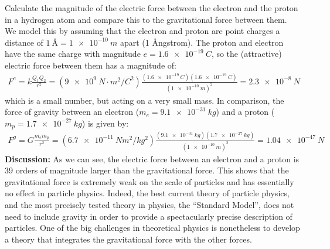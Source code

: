 \begin{example}{Calculate the magnitude of the electric force between the electron and the proton in a hydrogen atom and compare this to the gravitational force between them.}
We model this by assuming that the electron and proton are point charges a distance of $\SI{1}{\angstrom}=\SI{1e-10}{m}$ apart (1 \r Angstrom). The proton and electron have the same charge with magnitude $e=\SI{1.6e-19}{C}$, so the (attractive) electric force between them has a magnitude of:
\begin{align*}
F^e = k\frac{Q_1Q_2}{r^2}=(\SI{9e9}{N\cdot m^2/C^{2}})\frac{(\SI{1.6e-19}{C})(\SI{1.6e-19}{C})}{(\SI{1e-10}{m})^2}=\SI{2.3e-8}{N}
\end{align*}
which is a small number, but acting on a very small mass. In comparison, the force of gravity between an electron ($m_e=\SI{9.1e-31}{kg}$) and a proton ($m_p=\SI{1.7e-27}{kg}$) is given by:
\begin{align*}
F^g=G\frac{m_em_p}{r^2}=(\SI{6.7e-11}{Nm^2/kg^2})\frac{(\SI{9.1e-31}{kg})(\SI{1.7e-27}{kg})}{(\SI{1e-10}{m})^2}=\SI{1.04e-47}{N}
\end{align*}
\textbf{Discussion:} As we can see, the electric force between an electron and a proton is 39 orders of magnitude larger than the gravitational force. This shows that the gravitational force is extremely weak on the scale of particles and has essentially no effect in particle physics. Indeed, the best current theory of particle physics, and the most precisely tested theory in physics, the ``Standard Model'', does not need to include gravity in order to provide a spectacularly precise description of particles. One of the big challenges in theoretical physics is nonetheless to develop a theory that integrates the gravitational force with the other forces.
\end{example}
